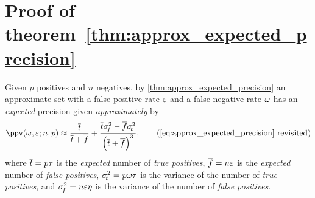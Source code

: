 
\section{Proof of theorem~\ref{thm:approx_expected_precision}}
\label{sec:proof_approx_expected_precision}
Given $p$ positives and $n$ negatives, by \cref{thm:approx_expected_precision} an approximate set with a false positive rate $\varepsilon$ and a false negative rate $\omega$ has an \emph{expected} precision given \emph{approximately} by
\begin{equation*}
    \ppv(\fnrate, \fprate ; n, p) \approx \frac{\overline{t}}{\overline{t} + \overline{f}} +
    \frac{\overline{t} \sigma_{\!f}^2 - \overline{f} \sigma_{\!t}^2}{\left(\overline{t} + \overline{f}\right)^3},
    \tag{\ref{eq:approx_expected_precision} revisited}
\end{equation*}
where $\overline{t} = p \tau$ is the \emph{expected} number of \emph{true positives}, $\overline{f} =  n \varepsilon$ is the \emph{expected} number of \emph{false positives}, $\sigma_{\!t}^2 = p \omega \tau$ is the variance of the number of \emph{true positives}, and $\sigma_{\!f}^2 = n \varepsilon \eta$ is the variance of the number of \emph{false positives}.
